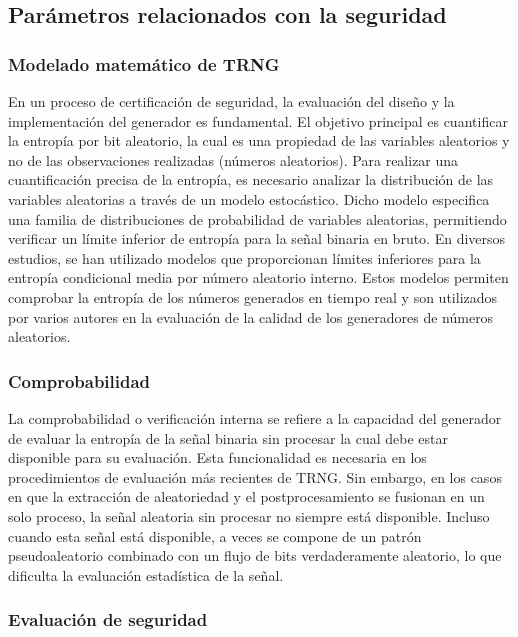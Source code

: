         \subsection{Parámetros relacionados con la seguridad}

            \subsubsection{Modelado matemático de TRNG}
            
            En un proceso de certificación de seguridad, la evaluación del diseño y la implementación del generador es fundamental. El objetivo principal es cuantificar la entropía por bit aleatorio, la cual es una propiedad de las variables aleatorios y no de las observaciones realizadas (números aleatorios). Para realizar una cuantificación precisa de la entropía, es necesario analizar la distribución de las variables aleatorias a través de un modelo estocástico. Dicho modelo especifica una familia de distribuciones de probabilidad de variables aleatorias, permitiendo verificar un límite inferior de entropía para la señal binaria en bruto. En diversos estudios, se han utilizado modelos que proporcionan límites inferiores para la entropía condicional media por número aleatorio interno. Estos modelos permiten comprobar la entropía de los números generados en tiempo real y son utilizados por varios autores en la evaluación de la calidad de los generadores de números aleatorios.

            \subsubsection{Comprobabilidad}

            La comprobabilidad o verificación interna se refiere a la capacidad del generador de evaluar la entropía de la señal binaria sin procesar la cual debe estar disponible para su evaluación. Esta funcionalidad es necesaria en los procedimientos de evaluación más recientes de TRNG. Sin embargo, en los casos en que la extracción de aleatoriedad y el postprocesamiento se fusionan en un solo proceso, la señal aleatoria sin procesar no siempre está disponible. Incluso cuando esta señal está disponible, a veces se compone de un patrón pseudoaleatorio combinado con un flujo de bits verdaderamente aleatorio, lo que dificulta la evaluación estadística de la señal. 

            \subsubsection{Evaluación de seguridad}

